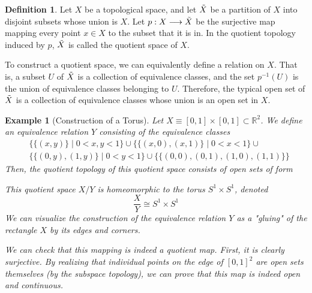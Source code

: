 \documentclass{article}
\newtheorem{example}{Example}[section]
\theoremstyle{remark}
\theoremstyle{definition}
\newtheorem{definition}{Definition}[section]
\begin{document}
\begin{definition}
Let $X$ be a topological space, and let $\Tilde{X}$ be a partition of $X$ into disjoint subsets whose union is $X$. Let $p: X \longrightarrow \Tilde{X}$ be the surjective map mapping every point $x \in X$ to the subset that it is in. In the quotient topology induced by $p$, $\Tilde{X}$ is called the quotient space of $X$. 
\end{definition}

To construct a quotient space, we can equivalently define a relation on $X$. That is, a subset $U$ of $\Tilde{X}$ is a collection of equivalence classes, and the set $p^{-1}(U)$ is the union of equivalence classes belonging to $U$. Therefore, the typical open set of $\Tilde{X}$ is a collection of equivalence classes whose union is an open set in $X$. 

\begin{example}[Construction of a Torus]
Let $X \equiv [0,1] \times [0,1] \subset \mathbb{R}^2$. We define an equivalence relation $Y$ consisting of the equivalence classes
\begin{align*}
    &\big\{\{(x, y)\} \; | \; 0<x, y<1\big\} \cup \big\{ \{(x, 0), (x,1)\} \; | \; 0<x<1 \big\} \cup \\
    &\big\{ \{(0,y), (1,y)\} \; | \; 0<y<1 \big\} \cup \big\{ \{(0,0), (0,1), (1,0), (1,1)\} \big\}
\end{align*}
Then, the quotient topology of this quotient space consists of open sets of form
\begin{center}
\end{center}
This quotient space $X / Y$ is homeomorphic to the torus $S^1 \times S^1$, denoted
\[\frac{X}{Y} \cong S^1 \times S^1\]
We can visualize the construction of the equivalence relation $Y$ as a "gluing" of the rectangle $X$ by its edges and corners. 

We can check that this mapping is indeed a quotient map. First, it is clearly surjective. By realizing that individual points on the edge of $[0,1]^2$ are open sets themselves (by the subspace topology), we can prove that this map is indeed open and continuous. 
\end{example}
\end{document}
